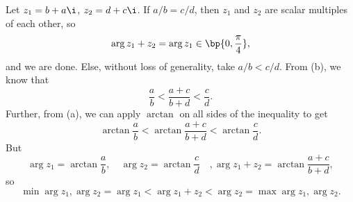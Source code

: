 \begin{solution}
\begin{ppart}
\begin{center}
        \end{center}
    \end{ppart}
    \begin{ppart}
        Let $z_1 = b + a\i$, $z_2 = d + c\i$. If $a/b = c/d$, then $z_1$ and $z_2$ are scalar multiples of each other, so \[\arg{z_1 + z_2} = \arg{z_1} \in \bp{0, \frac\pi4},\] and we are done. Else, without loss of generality, take $a/b < c/d$. From (b), we know that \[\frac{a}{b} < \frac{a + c}{b + d} < \frac{c}{d}.\] Further, from (a), we can apply $\arctan$ on all sides of the inequality to get \[\arctan \frac{a}{b} < \arctan \frac{a + c}{b + d} < \arctan \frac{c}{d}.\] But \[\arg{z_1} = \arctan \frac{a}{b}, \quad \arg{z_2} = \arctan \frac{c}{d} \quad, \arg{z_1 + z_2} = \arctan \frac{a + c}{b + d},\] so \[\min{\arg{z_1}, \arg{z_2}} = \arg{z_1} < \arg{z_1 + z_2} < \arg{z_2} = \max{\arg{z_1}, \arg{z_2}}.\]
    \end{ppart}
\end{solution}

